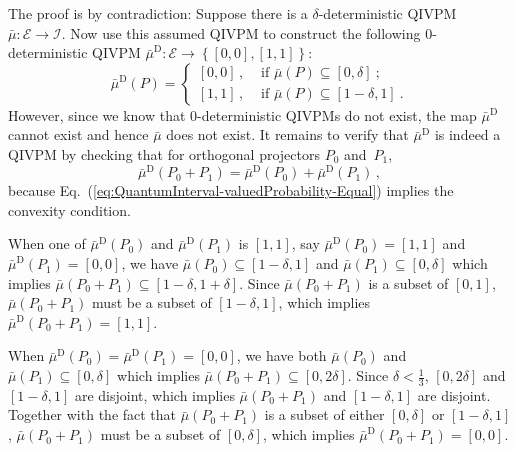 \documentclass[english,reprint, aps, prl,superscriptaddress, showpacs,
showkeys, longbibliography, amsmath, amssymb, floatfix]{revtex4-1}
\theoremstyle{plain}
\theoremstyle{definition}
\newcommand{\events}{\ensuremath{\mathcal{E}}}
\newcommand{\imposs}{\ensuremath{\left[0,0\right]}}
\newcommand{\necess}{\ensuremath{\left[1,1\right]}}
\begin{document}
The proof is by contradiction: Suppose there is a $\delta$-deterministic
QIVPM~$\bar{\mu}:\events\rightarrow\mathscr{I}$. Now use this assumed
QIVPM to construct the following $0$-deterministic QIVPM $\bar{\mu}^{\textrm{D}}:\events\rightarrow\left\{ \imposs,\necess\right\} $:
\begin{equation}
\bar{\mu}^{\textrm{D}}\left(P\right)=\begin{cases}
\imposs\,, & \textrm{ if }\bar{\mu}\left(P\right)\subseteq\left[0,\delta\right]\:;\\
\necess\,, & \textrm{ if }\bar{\mu}\left(P\right)\subseteq\left[1-\delta,1\right]\:.
\end{cases}
\end{equation}
However, since we know that $0$-deterministic QIVPMs do not exist,
the map $\bar{\mu}^{\textrm{D}}$ cannot exist and hence $\bar{\mu}$
does not exist. It remains to verify that $\bar{\mu}^{\textrm{D}}$
is indeed a QIVPM by checking that for orthogonal projectors $P_{0}$
and~$P_{1}$, 
\begin{equation}
\bar{\mu}^{\textrm{D}}\left(P_{0}+P_{1}\right)=\bar{\mu}^{\textrm{D}}\left(P_{0}\right)+\bar{\mu}^{\textrm{D}}\left(P_{1}\right)\,,\label{eq:QuantumInterval-valuedProbability-Equal}
\end{equation}
because Eq.~(\ref{eq:QuantumInterval-valuedProbability-Equal}) implies
the convexity condition.

When one of $\bar{\mu}^{\textrm{D}}\left(P_{0}\right)$ and $\bar{\mu}^{\textrm{D}}\left(P_{1}\right)$
is $\necess$, say $\bar{\mu}^{\textrm{D}}\left(P_{0}\right)=\necess$
and $\bar{\mu}^{\textrm{D}}\left(P_{1}\right)=\imposs$, we have $\bar{\mu}\left(P_{0}\right)\subseteq\left[1-\delta,1\right]$
and $\bar{\mu}\left(P_{1}\right)\subseteq\left[0,\delta\right]$ which
implies $\bar{\mu}\left(P_{0}+P_{1}\right)\subseteq\left[1-\delta,1+\delta\right]$.
Since $\bar{\mu}\left(P_{0}+P_{1}\right)$ is a subset of $\left[0,1\right]$,
$\bar{\mu}\left(P_{0}+P_{1}\right)$ must be a subset of $\left[1-\delta,1\right]$,
which implies $\bar{\mu}^{\textrm{D}}\left(P_{0}+P_{1}\right)=\necess$.

When
$\bar{\mu}^{\textrm{D}}\left(P_{0}\right)=\bar{\mu}^{\textrm{D}}\left(P_{1}\right)=\imposs$,
we have both $\bar{\mu}\left(P_{0}\right)$ and
$\bar{\mu}\left(P_{1}\right)\subseteq\left[0,\delta\right]$ which
implies
$\bar{\mu}\left(P_{0}+P_{1}\right)\subseteq\left[0,2\delta\right]$.
Since $\delta<\frac{1}{3}$, $\left[0,2\delta\right]$ and
$\left[1-\delta,1\right]$ are disjoint, which implies
$\bar{\mu}\left(P_{0}+P_{1}\right)$ and $\left[1-\delta,1\right]$ are
disjoint. Together with the fact that
$\bar{\mu}\left(P_{0}+P_{1}\right)$ is a subset of either
$\left[0,\delta\right]$ or $\left[1-\delta,1\right]$,
$\bar{\mu}\left(P_{0}+P_{1}\right)$ must be a subset of
$\left[0,\delta\right]$, which implies
$\bar{\mu}^{\textrm{D}}\left(P_{0}+P_{1}\right)=\imposs$.
\end{document}
